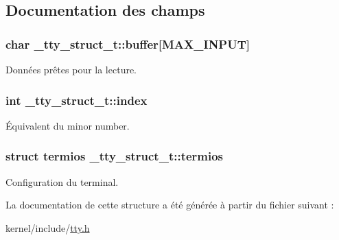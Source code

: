 \subsection{Documentation des champs}
\hypertarget{struct__tty__struct__t_ace735f0fca7a2e1c4c75f6ffb9223b19}{
\subsubsection[{buffer}]{\setlength{\rightskip}{0pt plus 5cm}char \+\_\+tty\+\_\+struct\+\_\+t\+::buffer\mbox{[}{\bf M\+A\+X\+\_\+\+I\+N\+P\+U\+T}\mbox{]}}}\label{struct__tty__struct__t_ace735f0fca7a2e1c4c75f6ffb9223b19}
Données prêtes pour la lecture. \hypertarget{struct__tty__struct__t_a4208e736cfcd8e0b00a3c0bbfe4674f7}{
\subsubsection[{index}]{\setlength{\rightskip}{0pt plus 5cm}int \+\_\+tty\+\_\+struct\+\_\+t\+::index}}\label{struct__tty__struct__t_a4208e736cfcd8e0b00a3c0bbfe4674f7}
Équivalent du minor number. \hypertarget{struct__tty__struct__t_a39471b82fd4e3a235744e73775ac2523}{
\subsubsection[{termios}]{\setlength{\rightskip}{0pt plus 5cm}struct {\bf termios} \+\_\+tty\+\_\+struct\+\_\+t\+::termios}}\label{struct__tty__struct__t_a39471b82fd4e3a235744e73775ac2523}
Configuration du terminal. 

La documentation de cette structure a été générée à partir du fichier suivant \+:\begin{DoxyCompactItemize}
\item 
kernel/include/\hyperlink{tty_8h}{tty.\+h}\end{DoxyCompactItemize}
